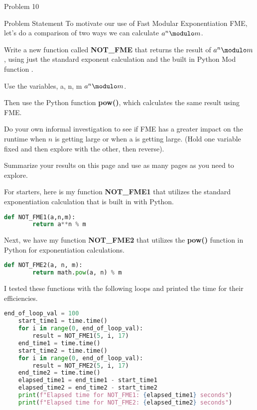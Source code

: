 \begin{problem}{Problem 10}
    \begin{statement}{Problem Statement}
        To motivate our use of Fast Modular Exponentiation FME, let’s do a comparison of two ways we can calculate $a^{n} \modulo m$. \vspace*{1em}

        Write a new function called \textbf{NOT\_FME} that returns the result of $a^{n} \modulo m$, using just the standard exponent calculation and the built in Python Mod function \modulo. \vspace*{1em}

        Use the variables, a, n, m $a^{n} \modulo m$. \vspace*{1em}

        Then use the Python function \textbf{pow()}, which calculates the same result using FME. \vspace*{1em}

        Do your own informal investigation to see if FME has a greater impact on the runtime when $n$ is getting large or when a is getting large. (Hold one variable fixed and then explore with the 
        other, then reverse). \vspace*{1em}

        Summarize your results on this page and use as many pages as you need to explore.
    \end{statement}

    \begin{highlight}[Solution]
        For starters, here is my function \textbf{NOT\_FME1} that utilizes the standard exponentiation calculation that is built in with Python.
    \begin{lstlisting}[style=stackoverflow, language=python]
    def NOT_FME1(a,n,m):
        return a**n % m
    \end{lstlisting}

        Next, we have my function \textbf{NOT\_FME2} that utilizes the \textbf{pow()} function in Python for exponentiation calculations.
    \begin{lstlisting}[style=stackoverflow, language=python]
    def NOT_FME2(a, n, m):
        return math.pow(a, n) % m
    \end{lstlisting}

        I tested these functions with the following loops and printed the time for their efficiencies.
    \begin{lstlisting}[style=stackoverflow, language=python]
    end_of_loop_val = 100
    start_time1 = time.time()
    for i in range(0, end_of_loop_val):
        result = NOT_FME1(5, i, 17)
    end_time1 = time.time()
    start_time2 = time.time()
    for i in range(0, end_of_loop_val):
        result = NOT_FME2(5, i, 17)
    end_time2 = time.time()
    elapsed_time1 = end_time1 - start_time1
    elapsed_time2 = end_time2 - start_time2
    print(f"Elapsed time for NOT_FME1: {elapsed_time1} seconds")
    print(f"Elapsed time for NOT_FME2: {elapsed_time2} seconds")
    \end{lstlisting}


\end{highlight}
\end{problem}
